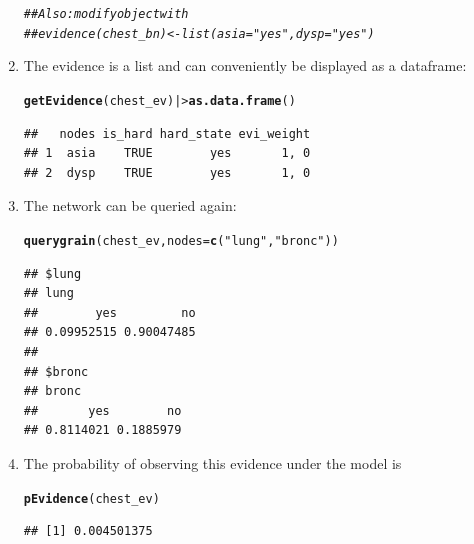 \documentclass[10pt]{article}\usepackage[]{graphicx}\usepackage[]{xcolor}
\makeatletter
\newcommand{\hlstr}[1]{\textcolor[rgb]{0.192,0.494,0.8}{#1}}%
\newcommand{\hlcom}[1]{\textcolor[rgb]{0.678,0.584,0.686}{\textit{#1}}}%
\newcommand{\hlstd}[1]{\textcolor[rgb]{0.345,0.345,0.345}{#1}}%
\newcommand{\hlkwc}[1]{\textcolor[rgb]{0.333,0.667,0.333}{#1}}%
\newcommand{\hlkwd}[1]{\textcolor[rgb]{0.737,0.353,0.396}{\textbf{#1}}}%
\newenvironment{kframe}{%
 \def\at@end@of@kframe{}%
 \ifinner\ifhmode%
  \def\at@end@of@kframe{\end{minipage}}%
  \begin{minipage}{\columnwidth}%
 \fi\fi%
 \def\FrameCommand##1{\hskip\@totalleftmargin \hskip-\fboxsep
 \colorbox{shadecolor}{##1}\hskip-\fboxsep
     \hskip-\linewidth \hskip-\@totalleftmargin \hskip\columnwidth}%
 \MakeFramed {\advance\hsize-\width
   \@totalleftmargin\z@ \linewidth\hsize
   \@setminipage}}%
 {\par\unskip\endMakeFramed%
 \at@end@of@kframe}
\newenvironment{knitrout}{}{} %
\makeatother
\begin{document}
\begin{enumerate}
\begin{knitrout}
\begin{kframe}
\begin{alltt}
\hlcom{## Also: modify object with}
\hlcom{## evidence(chest_bn) <- list(asia="yes", dysp="yes")}
\end{alltt}
\end{kframe}
\end{knitrout}

\item The evidence is a list and can conveniently be displayed as a dataframe:

\begin{knitrout}
\color{fgcolor}\begin{kframe}
\begin{alltt}
\hlkwd{getEvidence}\hlstd{(chest_ev) |>} \hlkwd{as.data.frame}\hlstd{()}
\end{alltt}
\begin{verbatim}
##   nodes is_hard hard_state evi_weight
## 1  asia    TRUE        yes       1, 0
## 2  dysp    TRUE        yes       1, 0
\end{verbatim}
\end{kframe}
\end{knitrout}

\item The network can be queried again:
\begin{knitrout}
\color{fgcolor}\begin{kframe}
\begin{alltt}
\hlkwd{querygrain}\hlstd{(chest_ev,} \hlkwc{nodes}\hlstd{=}\hlkwd{c}\hlstd{(}\hlstr{"lung"}\hlstd{,} \hlstr{"bronc"}\hlstd{))}
\end{alltt}
\begin{verbatim}
## $lung
## lung
##        yes         no 
## 0.09952515 0.90047485 
## 
## $bronc
## bronc
##       yes        no 
## 0.8114021 0.1885979
\end{verbatim}
\end{kframe}
\end{knitrout}


\item The probability of observing this evidence under the model is
\begin{knitrout}
\color{fgcolor}\begin{kframe}
\begin{alltt}
\hlkwd{pEvidence}\hlstd{(chest_ev)}
\end{alltt}
\begin{verbatim}
## [1] 0.004501375
\end{verbatim}
\end{kframe}
\end{knitrout}


\end{enumerate}
\end{document}
